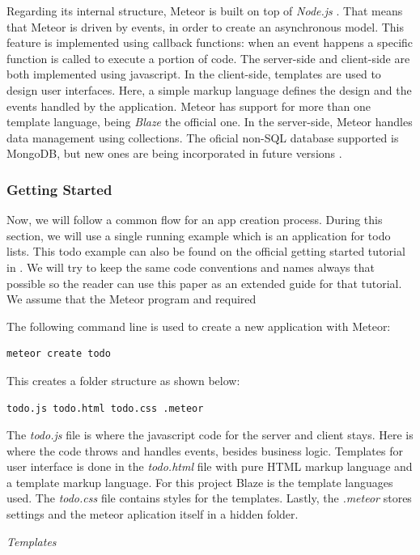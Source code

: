 Regarding its internal structure, Meteor is built on top of \emph{Node.js} \cite{node}.
That means that Meteor is driven by events, in order to create an asynchronous model.
This feature is implemented using callback functions: when an event happens a specific function is called to execute a portion of code.
The server-side and client-side are both implemented using javascript.
In the client-side, templates are used to design user interfaces.
Here, a simple markup language defines the design and the events handled by the application.
Meteor has support for more than one template language, being \emph{Blaze} \cite{meteor} the official one.
In the server-side, Meteor handles data management using collections.
The oficial non-SQL database supported is MongoDB, but new ones are being incorporated in future versions \cite{fathom}.


\subsubsection{Getting Started}

Now, we will follow a common flow for an app creation process.
During this section, we will use a single running example which is an application for todo lists.
This todo example can also be found on the official getting started tutorial in \cite{meteor}.
We will try to keep the same code conventions and names always that possible so the reader can use this paper as an extended guide for that tutorial.
We assume that the Meteor program and required 

The following command line is used to create a new application with Meteor:
\begin{lstlisting}[language=bash]
meteor create todo
\end{lstlisting}
This creates a folder structure as shown below:
\begin{lstlisting}[language=bash]
todo.js todo.html todo.css .meteor
\end{lstlisting}
The \emph{todo.js} file is where the javascript code for the server and client stays.
Here is where the code throws and handles events, besides business logic.
Templates for user interface is done in the \emph{todo.html} file with pure HTML markup language and a template markup language.
For this project Blaze is the template languages used.
The \emph{todo.css} file contains styles for the templates.
Lastly, the \emph{.meteor} stores settings and the meteor aplication itself in a hidden folder.

\emph{Templates}

